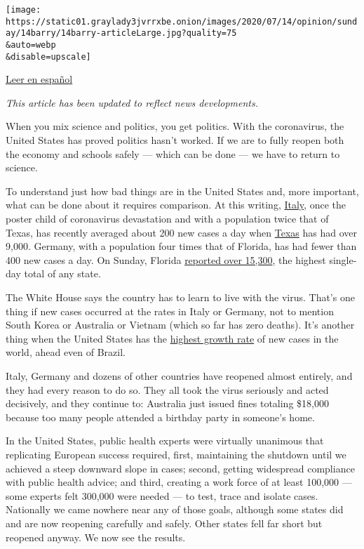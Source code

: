 \texttt{[image: https://static01.graylady3jvrrxbe.onion/images/2020/07/14/opinion/sunday/14barry/14barry-articleLarge.jpg?quality=75\\\&auto=webp\\\&disable=upscale]}

\href{https://www.nytimes3xbfgragh.onion/es/2020/07/16/espanol/opinion/coronavirus-cuarentena.html}{Leer
en español}

\emph{This article has been updated to reflect news developments.}

When you mix science and politics, you get politics. With the
coronavirus, the United States has proved politics hasn't worked. If we
are to fully reopen both the economy and schools safely --- which can be
done --- we have to return to science.

To understand just how bad things are in the United States and, more
important, what can be done about it requires comparison. At this
writing,
\href{https://www.nytimes3xbfgragh.onion/interactive/2020/world/coronavirus-maps.html}{Italy},
once the poster child of coronavirus devastation and with a population
twice that of Texas, has recently averaged about 200 new cases a day
when
\href{https://www.nytimes3xbfgragh.onion/interactive/2020/us/texas-coronavirus-cases.html}{Texas}
has had over 9,000. Germany, with a population four times that of
Florida, has had fewer than 400 new cases a day. On Sunday, Florida
\href{https://www.nytimes3xbfgragh.onion/2020/07/12/us/florida-coronavirus-covid-cases.html}{reported
over 15,300}, the highest single-day total of any state.

The White House says the country has to learn to live with the virus.
That's one thing if new cases occurred at the rates in Italy or Germany,
not to mention South Korea or Australia or Vietnam (which so far has
zero deaths). It's another thing when the United States has the
\href{https://coronavirus.jhu.edu/data/new-cases}{highest growth rate}
of new cases in the world, ahead even of Brazil.

Italy, Germany and dozens of other countries have reopened almost
entirely, and they had every reason to do so. They all took the virus
seriously and acted decisively, and they continue to: Australia just
issued fines totaling \$18,000 because too many people attended a
birthday party in someone's home.

In the United States, public health experts were virtually unanimous
that replicating European success required, first, maintaining the
shutdown until we achieved a steep downward slope in cases; second,
getting widespread compliance with public health advice; and third,
creating a work force of at least 100,000 --- some experts felt 300,000
were needed --- to test, trace and isolate cases. Nationally we came
nowhere near any of those goals, although some states did and are now
reopening carefully and safely. Other states fell far short but reopened
anyway. We now see the results.


